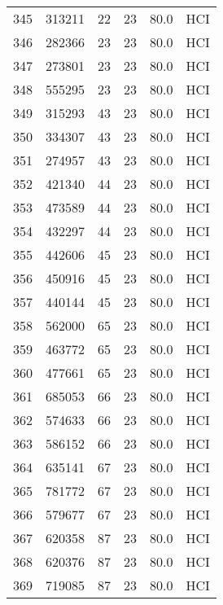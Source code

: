 \begin{longtable}{lrrrrl}
345 &    313211 &         22 &        23 &           80.0 &  HCI \\
346 &    282366 &         23 &        23 &           80.0 &  HCI \\
347 &    273801 &         23 &        23 &           80.0 &  HCI \\
348 &    555295 &         23 &        23 &           80.0 &  HCI \\
349 &    315293 &         43 &        23 &           80.0 &  HCI \\
350 &    334307 &         43 &        23 &           80.0 &  HCI \\
351 &    274957 &         43 &        23 &           80.0 &  HCI \\
352 &    421340 &         44 &        23 &           80.0 &  HCI \\
353 &    473589 &         44 &        23 &           80.0 &  HCI \\
354 &    432297 &         44 &        23 &           80.0 &  HCI \\
355 &    442606 &         45 &        23 &           80.0 &  HCI \\
356 &    450916 &         45 &        23 &           80.0 &  HCI \\
357 &    440144 &         45 &        23 &           80.0 &  HCI \\
358 &    562000 &         65 &        23 &           80.0 &  HCI \\
359 &    463772 &         65 &        23 &           80.0 &  HCI \\
360 &    477661 &         65 &        23 &           80.0 &  HCI \\
361 &    685053 &         66 &        23 &           80.0 &  HCI \\
362 &    574633 &         66 &        23 &           80.0 &  HCI \\
363 &    586152 &         66 &        23 &           80.0 &  HCI \\
364 &    635141 &         67 &        23 &           80.0 &  HCI \\
365 &    781772 &         67 &        23 &           80.0 &  HCI \\
366 &    579677 &         67 &        23 &           80.0 &  HCI \\
367 &    620358 &         87 &        23 &           80.0 &  HCI \\
368 &    620376 &         87 &        23 &           80.0 &  HCI \\
369 &    719085 &         87 &        23 &           80.0 &  HCI \\

\end{longtable}
